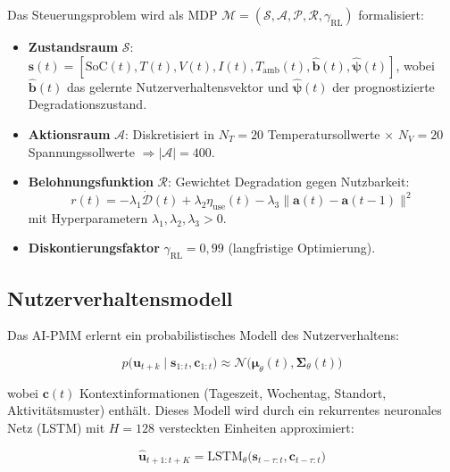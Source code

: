 ﻿\documentclass[12pt,a4paper]{article}
\begin{document}
	Das Steuerungsproblem wird als MDP $\mathcal{M} = (\mathcal{S}, \mathcal{A}, \mathcal{P}, \mathcal{R}, \gamma_\mathrm{RL})$
	formalisiert:
	
	\begin{itemize}[leftmargin=*]
		\item \textbf{Zustandsraum} $\mathcal{S}$: $\mathbf{s}(t) = [\text{SoC}(t), T(t), V(t), I(t),
		T_\mathrm{amb}(t), \hat{\mathbf{b}}(t), \hat{\boldsymbol{\psi}}(t)]$,
		wobei $\hat{\mathbf{b}}(t)$ das gelernte Nutzerverhaltensvektor und
		$\hat{\boldsymbol{\psi}}(t)$ der prognostizierte Degradationszustand.
		
		\item \textbf{Aktionsraum} $\mathcal{A}$: Diskretisiert in
		$N_T = 20$ Temperatursollwerte $\times$ $N_V = 20$ Spannungssollwerte
		$\Rightarrow |\mathcal{A}| = 400$.
		
		\item \textbf{Belohnungsfunktion} $\mathcal{R}$: Gewichtet Degradation
		gegen Nutzbarkeit:
		\begin{equation}
			r(t) = -\lambda_1 \dot{\mathcal{D}}(t) + \lambda_2 \eta_\mathrm{use}(t)
			- \lambda_3 \|\mathbf{a}(t) - \mathbf{a}(t-1)\|^2
			\label{eq:reward}
		\end{equation}
		mit Hyperparametern $\lambda_1, \lambda_2, \lambda_3 > 0$.
		
		\item \textbf{Diskontierungsfaktor} $\gamma_\mathrm{RL} = 0{,}99$ (langfristige Optimierung).
	\end{itemize}
	
	\subsection{Nutzerverhaltensmodell}
	
	Das AI-PMM erlernt ein probabilistisches Modell des Nutzerverhaltens:
	
	\begin{equation}
		p\bigl(\mathbf{u}_{t+k} \mid \mathbf{s}_{1:t}, \mathbf{c}_{1:t}\bigr)
		\approx \mathcal{N}\bigl(\boldsymbol{\mu}_\theta(t), \boldsymbol{\Sigma}_\theta(t)\bigr)
		\label{eq:user_model}
	\end{equation}
	
	wobei $\mathbf{c}(t)$ Kontextinformationen (Tageszeit, Wochentag, Standort,
	Aktivitätsmuster) enthält. Dieses Modell wird durch ein rekurrentes neuronales
	Netz (LSTM) mit $H = 128$ versteckten Einheiten approximiert:
	
	\begin{equation}
		\hat{\mathbf{u}}_{t+1:t+K} = \mathrm{LSTM}_\theta\bigl(\mathbf{s}_{t-\tau:t},
		\mathbf{c}_{t-\tau:t}\bigr)
		\label{eq:lstm_prediction}
	\end{equation}
	
\end{document}
